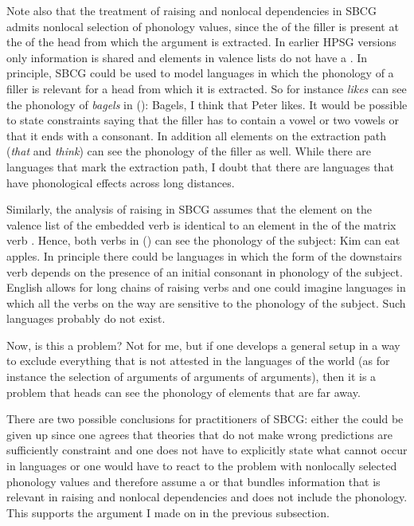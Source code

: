 Note also that the treatment of raising and nonlocal dependencies in SBCG admits nonlocal selection of phonology
values, since the \formv of the filler is present at the \argstl of the head from which the argument
is extracted. In earlier HPSG versions only \local information is shared and elements in valence lists
do not have a \phonf. In principle, SBCG could be used to model languages in which the phonology of
a filler is relevant for a head from which it is extracted. So for instance \emph{likes} can see the
phonology of \emph{bagels} in ():
\ea
Bagels, I think that Peter likes.
\z
It would be possible to state constraints saying that the filler has to contain a vowel or two
vowels or that it ends with a consonant. In addition all elements on the extraction path
(\emph{that} and \emph{think}) can see the phonology of the filler as well. While there are
languages that mark the extraction path, I doubt that there are languages that have phonological
effects across long distances. 

Similarly, the analysis of raising in SBCG assumes that the element on the valence list of the
embedded verb is identical to an element in the \argstl of the matrix verb \citep[]{Sag2012a}. Hence, both verbs in () can see the phonology of the subject:
\ea
Kim can eat apples.
\z
In principle there could be languages in which the form of the downstairs verb depends on the
presence of an initial consonant in phonology of the subject. English allows for long chains of
raising verbs and one could imagine languages in which all the verbs on the way are sensitive to the
phonology of the subject. Such languages probably do not exist.

Now, is this a problem? Not for me, but if one develops a general setup in a
way to exclude everything that is not attested in the languages of the world (as for instance the
selection of arguments of arguments of arguments), then it is a problem that heads can see the
phonology of elements that are far away.

There are two possible conclusions for practitioners of SBCG: either the \motherf could be given up
since one agrees that theories that do not make wrong predictions are sufficiently constraint and
one does not have to explicitly state what cannot occur in languages or one would have to react to
the problem with nonlocally selected phonology values and therefore assume a \synsem or \localf that
bundles information that is relevant in raising and nonlocal dependencies and does not include the
phonology.
This supports the argument I made on \mother in the previous subsection.


